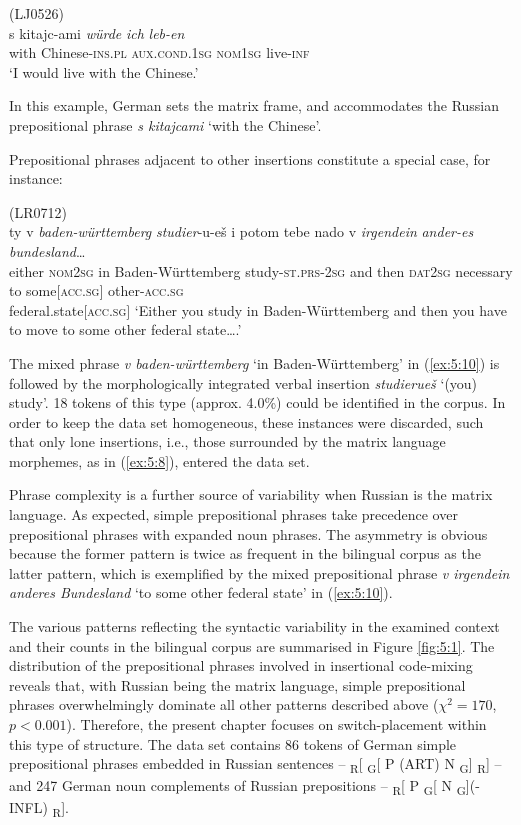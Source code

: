 \ea
\label{ex:5:9}
(LJ0526)\\
\gll s kitajc-ami \textit{würde} \textit{ich} \textit{leb-en}\\
	{with} Chinese-\textsc{ins.pl} \textsc{aux.cond.1sg} \textsc{nom1sg} live-\textsc{inf}\\
\glt `I would live with the Chinese.'
\z

\noindent
In this example, German sets the matrix frame, and accommodates the Russian prepositional phrase \textit{s kitajcami} `with the Chinese'. 

Prepositional phrases adjacent to other insertions constitute a special case, for instance:

\ea
\label{ex:5:10}
(LR0712)\\
 {ty} {v} \textit{baden-württemberg} \textit{studier}-{u-eš} {i} {potom} {tebe} {nado} {v} \textit{irgendein} \textit{ander-es} \textit{bundesland}\dots{}\\
	{either} \textsc{nom2sg} in Baden-Württemberg study-\textsc{st.prs-2sg} and then \textsc{dat2sg} necessary to some$[$\textsc{acc.sg}$]$ other-\textsc{acc.sg}\\ federal.state$[$\textsc{acc.sg}$]$
\glt `Either you study in Baden-Württemberg and then you have to move to some other federal state\dots{}.'
\z

\noindent The mixed phrase \textit{v baden-württemberg} `in Baden-Württemberg' in (\ref{ex:5:10}) is followed by the morphologically integrated verbal insertion \textit{studierueš} `(you) study'. 18 tokens of this type (approx. 4.0\%) could be identified in the corpus. In order to keep the data set homogeneous, these instances were discarded, such that only lone insertions, i.e., those surrounded by the matrix language morphemes, as in (\ref{ex:5:8}), entered the data set.

Phrase complexity is a further source of variability  when Russian is the matrix language. As expected, simple prepositional phrases take precedence over prepositional phrases with expanded noun phrases. The asymmetry is obvious because the former pattern is twice as frequent in the bilingual corpus as the latter pattern, which is exemplified by the mixed prepositional phrase \textit{v irgendein anderes Bundesland} `to some other federal state' in (\ref{ex:5:10}). 

The various patterns reflecting the syntactic variability in the examined context and their counts in the bilingual corpus are summarised in Figure \ref{fig:5:1}. The distribution of the prepositional phrases involved in insertional code-mixing reveals that, with Russian being the matrix language, simple prepositional phrases overwhelmingly dominate all other patterns described above ($\chi^2 = 170$, $p < 0.001$). Therefore, the present chapter focuses on switch-placement within this type of structure. The data set contains 86 tokens of German simple prepositional phrases embedded in Russian sentences -- \textsubscript{R}[ \textsubscript{G}[ P (ART) N \textsubscript{G}] \textsubscript{R}] -- and 247 German noun complements of Russian prepositions -- \textsubscript{R}[ P \textsubscript{G}[ N  \textsubscript{G}](-INFL) \textsubscript{R}].

